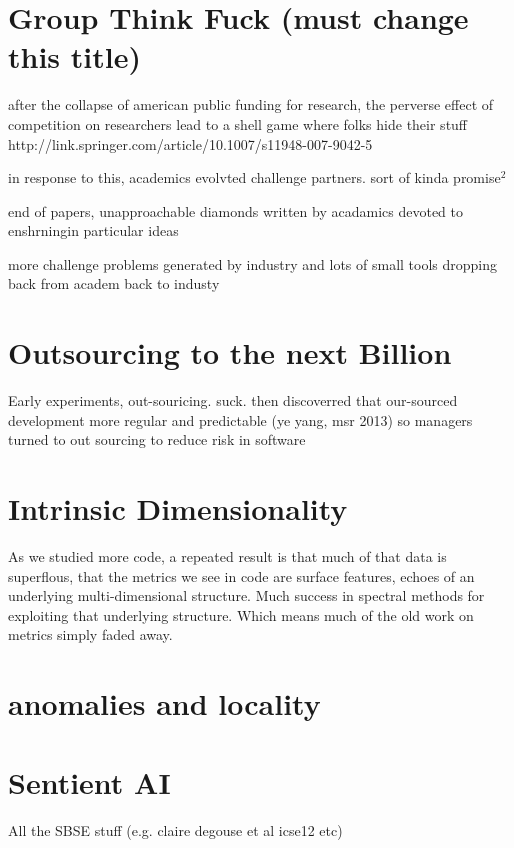 \documentclass[journal]{IEEEtran}
\begin{document}
\begin{itemize}
{\section{Group Think Fuck (must change this title)}

after the collapse of american public funding for research, the
perverse effect of competition on researchers lead to a shell game where folks hide their stuff http://link.springer.com/article/10.1007/s11948-007-9042-5

in response to this, academics evolvted challenge partners.
sort of kinda promise$^2$

end of papers, unapproachable diamonds written by acadamics devoted
to enshrningin particular ideas

more challenge problems generated by industry and lots of small tools dropping
back from academ back to industy



\section{Outsourcing to the next Billion}

Early experiments, out-souricing. suck. then discoverred
that our-sourced development more regular and  predictable (ye yang, msr 2013) so managers turned to out sourcing to reduce risk in
software 

\section{Intrinsic Dimensionality}

As we studied more code, a repeated result is that much of that data is superflous, that the metrics we see in code are surface features, echoes of an underlying multi-dimensional structure. Much success in spectral methods for exploiting that underlying structure. Which means much of the old work on metrics simply faded away.

\section{anomalies and locality}


\section{Sentient AI}

All the SBSE stuff (e.g. claire degouse et al icse12 etc)

}
\end{itemize}
\end{document}
